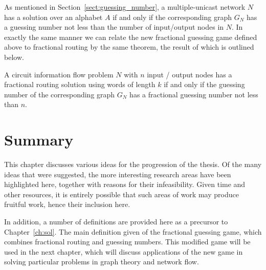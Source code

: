 As mentioned in Section~\ref{sect:guessing_number}, a multiple-unicast network $N$ has a solution over an alphabet $A$ if and only if the corresponding graph $G_N$ has a guessing number not less than the number of input/output nodes in $N$. In exactly the same manner we can relate the new fractional guessing game defined above to fractional routing by the same theorem, the result of which is outlined below.

\begin{theorem}
A circuit information flow problem $N$ with $n$ input / output nodes has a fractional routing solution using words of length $k$ if and only if the guessing number of the corresponding graph $G_N$ has a fractional guessing number not less than $n$.
\end{theorem}

\section{Summary}

This chapter discusses various ideas for the progression of the thesis. Of the many ideas that were suggested, the more interesting research areas have been highlighted here, together with reasons for their infeasibility. Given time and other resources, it is entirely possible that such areas of work may produce fruitful work, hence their inclusion here.

In addition, a number of definitions are provided here as a precursor to Chapter~\ref{ch:sol}. The main definition given of the fractional guessing game, which combines fractional routing and guessing numbers. This modified game will be used in the next chapter, which will discuss applications of the new game in solving particular problems in graph theory and network flow.